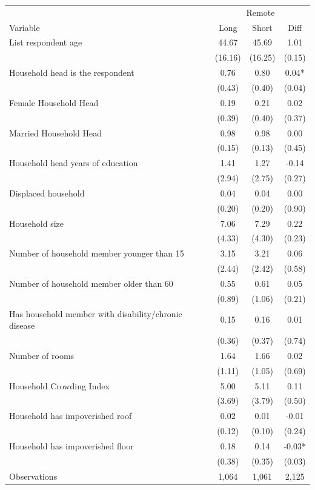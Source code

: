 \begin{tabular}{l*{3}c}
\hline\hline
 & \multicolumn{3}{c}{Remote}\\ 
Variable & Long & Short & Diff \\
\hline
List respondent age&44.67&45.69&1.01\\
&(16.16)&(16.25)&(0.15)\\
Household head is the respondent&0.76&0.80&0.04*\\
&(0.43)&(0.40)&(0.04)\\
Female Household Head&0.19&0.21&0.02\\
&(0.39)&(0.40)&(0.37)\\
Married Household Head&0.98&0.98&0.00\\
&(0.15)&(0.13)&(0.45)\\
Household head years of education&1.41&1.27&-0.14\\
&(2.94)&(2.75)&(0.27)\\
Displaced household&0.04&0.04&0.00\\
&(0.20)&(0.20)&(0.90)\\
Household size&7.06&7.29&0.22\\
&(4.33)&(4.30)&(0.23)\\
Number of household member younger than 15&3.15&3.21&0.06\\
&(2.44)&(2.42)&(0.58)\\
Number of household member older than 60&0.55&0.61&0.05\\
&(0.89)&(1.06)&(0.21)\\
Has household member with disability/chronic disease&0.15&0.16&0.01\\
&(0.36)&(0.37)&(0.74)\\
Number of rooms&1.64&1.66&0.02\\
&(1.11)&(1.05)&(0.69)\\
Household Crowding Index&5.00&5.11&0.11\\
&(3.69)&(3.79)&(0.50)\\
Household has impoverished roof&0.02&0.01&-0.01\\
&(0.12)&(0.10)&(0.24)\\
Household has impoverished floor&0.18&0.14&-0.03*\\
&(0.38)&(0.35)&(0.03)\\
\hline
Observations & 1,064 & 1,061 & 2,125 \\
\hline\hline
\end{tabular}

